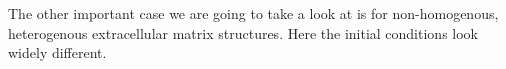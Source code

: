 The other important case we are going to take a look at is for non-homogenous, heterogenous extracellular matrix structures. Here the initial conditions look widely different. 

